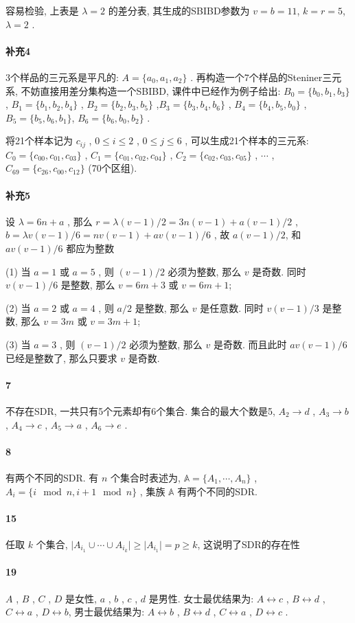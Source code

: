 \documentclass[a4paper, UTF8]{ctexart}				%
\numberwithin{equation}{section}				%
\begin{document}
        容易检验, 上表是 $\lambda = 2$ 的差分表, 其生成的SBIBD参数为 $v=b=11$, $k=r=5$, $\lambda = 2$ .
    \paragraph{补充4}\quad 
        3个样品的三元系是平凡的: $A = \{a_0, a_1, a_2\}$ . 再构造一个7个样品的Steniner三元系, 不妨直接用差分集构造一个SBIBD, 课件中已经作为例子给出:
        $B_0 = \{b_0, b_1, b_3\}$ , $B_1 = \{b_1, b_2, b_4\}$ , $B_2 = \{b_2, b_3, b_5\}$ ,$ B_3 = \{b_3, b_4, b_6\}$ , $B_4 = \{b_4, b_5, b_0\}$ , $B_5 = \{b_5, b_6, b_1\}$, $B_6 = \{b_6, b_0, b_2\}$ .

        将21个样本记为 $c_{ij}$ , $0 \le i \le 2$ ,  $0 \le j \le 6$ , 可以生成21个样本的三元系: 
        $C_0 = \{c_{00}, c_{01}, c_{03}\}$ , $C_1 = \{c_{01}, c_{02}, c_{04}\}$ , $C_2 = \{c_{02}, c_{03}, c_{05}\}$ , $\cdots$ , $C_69 = \{c_{26}, c_{00}, c_{12}\}$ (70个区组).
    \paragraph{补充5}\quad 
        设 $\lambda=6n+a$ , 那么 $r = \lambda(v-1)/2 = 3n(v-1) + a(v-1)/2$ , $b = \lambda v(v-1)/6 = nv(v-1) + av(v-1)/6$ , 故 $a(v-1)/2$, 和 $av(v-1)/6$ 都应为整数
        
        (1) 当 $a=1$ 或 $a=5$ , 则 $(v-1)/2$ 必须为整数, 那么 $v$ 是奇数. 同时 $v(v-1)/6$ 是整数, 那么 $v=6m+3$ 或 $v=6m+1$;

        (2) 当 $a=2$ 或 $a=4$ , 则 $a/2$ 是整数, 那么 $v$ 是任意数. 同时 $v(v-1)/3$ 是整数, 那么 $v=3m$ 或 $v=3m+1$;

        (3) 当 $a=3$ , 则 $(v-1)/2$ 必须为整数, 那么 $v$ 是奇数. 而且此时 $av(v-1)/6$ 已经是整数了, 那么只要求 $v$ 是奇数.

    \paragraph{7}\quad 
        不存在SDR, 一共只有5个元素却有6个集合. 集合的最大个数是5, $A_2 \rightarrow d$ , $A_3 \rightarrow b$ , $A_4 \rightarrow c$ , $A_5 \rightarrow a$ , $A_6 \rightarrow e$ .
    \paragraph{8}\quad 
        有两个不同的SDR. 有 $n$ 个集合时表述为, $\mathbb{A} = \{A_1, \cdots, A_n\}$ , $A_i = \{i \mod n, i+1 \mod n\}$ , 集族 $\mathbb{A}$ 有两个不同的SDR.
    \paragraph{15}\quad 
        任取 $k$ 个集合, $\vert{A_{i_1} \cup \cdots \cup A_{i_k}}\vert \ge \vert{A_{i_1}}\vert = p \ge k$, 这说明了SDR的存在性
    \paragraph{19}\quad 
        $A$ , $B$ , $C$ , $D$ 是女性, $a$ , $b$ , $c$ , $d$ 是男性. 女士最优结果为: $A \leftrightarrow c$ , $B \leftrightarrow d$ , $C \leftrightarrow a$ , $D \leftrightarrow b$, 男士最优结果为: $A \leftrightarrow b$ , $B \leftrightarrow d$ , $C \leftrightarrow a$ , $D \leftrightarrow c$ .
\end{document}
